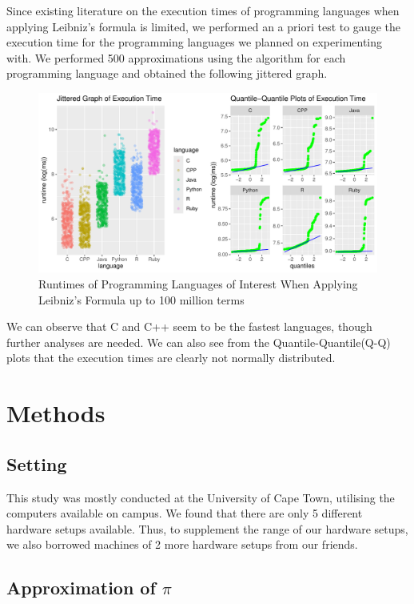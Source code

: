 \documentclass[12pt,halfline,a4paper,]{ouparticle}
\begin{document}
Since existing literature on the execution times of programming
languages when applying Leibniz's formula is limited, we performed an a
priori test to gauge the execution time for the programming languages we
planned on experimenting with. We performed 500 approximations using the
algorithm for each programming language and obtained the following
jittered graph.

\begin{figure}[H]
\includegraphics[width=1\linewidth]{skeleton_files/figure-latex/figPrior-1} \caption{Runtimes of Programming Languages of Interest When Applying Leibniz's Formula up to 100 million terms}\label{fig:figPrior}
\end{figure}

We can observe that C and C++ seem to be the fastest languages, though
further analyses are needed. We can also see from the
Quantile-Quantile(Q-Q) plots that the execution times are clearly not
normally distributed. \newpage

\section{Methods}\label{methods}

\subsection{Setting}\label{setting}

This study was mostly conducted at the University of Cape Town,
utilising the computers available on campus. We found that there are
only 5 different hardware setups available. Thus, to supplement the
range of our hardware setups, we also borrowed machines of 2 more
hardware setups from our friends.

\subsection{\texorpdfstring{Approximation of
\(\pi\)}{Approximation of \textbackslash pi}}\label{approximation-of-pi}
\end{document}
